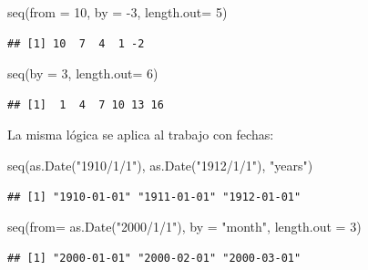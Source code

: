 \documentclass[
]{book}
\newenvironment{Shaded}{\begin{snugshade}}{\end{snugshade}}
\newcommand{\AttributeTok}[1]{\textcolor[rgb]{0.77,0.63,0.00}{#1}}
\newcommand{\DecValTok}[1]{\textcolor[rgb]{0.00,0.00,0.81}{#1}}
\newcommand{\FunctionTok}[1]{\textcolor[rgb]{0.00,0.00,0.00}{#1}}
\newcommand{\NormalTok}[1]{#1}
\newcommand{\SpecialCharTok}[1]{\textcolor[rgb]{0.00,0.00,0.00}{#1}}
\newcommand{\StringTok}[1]{\textcolor[rgb]{0.31,0.60,0.02}{#1}}
\begin{document}
\begin{Shaded}
\begin{Highlighting}[]
\FunctionTok{seq}\NormalTok{(}\AttributeTok{from =} \DecValTok{10}\NormalTok{, }\AttributeTok{by =} \SpecialCharTok{{-}}\DecValTok{3}\NormalTok{, }\AttributeTok{length.out=} \DecValTok{5}\NormalTok{)}
\end{Highlighting}
\end{Shaded}

\begin{verbatim}
## [1] 10  7  4  1 -2
\end{verbatim}

\begin{Shaded}
\begin{Highlighting}[]
\FunctionTok{seq}\NormalTok{(}\AttributeTok{by =} \DecValTok{3}\NormalTok{, }\AttributeTok{length.out=} \DecValTok{6}\NormalTok{)}
\end{Highlighting}
\end{Shaded}

\begin{verbatim}
## [1]  1  4  7 10 13 16
\end{verbatim}

La misma lógica se aplica al trabajo con fechas:

\begin{Shaded}
\begin{Highlighting}[]
\FunctionTok{seq}\NormalTok{(}\FunctionTok{as.Date}\NormalTok{(}\StringTok{"1910/1/1"}\NormalTok{), }\FunctionTok{as.Date}\NormalTok{(}\StringTok{"1912/1/1"}\NormalTok{), }\StringTok{"years"}\NormalTok{)}
\end{Highlighting}
\end{Shaded}

\begin{verbatim}
## [1] "1910-01-01" "1911-01-01" "1912-01-01"
\end{verbatim}

\begin{Shaded}
\begin{Highlighting}[]
\FunctionTok{seq}\NormalTok{(}\AttributeTok{from=} \FunctionTok{as.Date}\NormalTok{(}\StringTok{"2000/1/1"}\NormalTok{), }\AttributeTok{by =} \StringTok{"month"}\NormalTok{, }\AttributeTok{length.out =} \DecValTok{3}\NormalTok{)}
\end{Highlighting}
\end{Shaded}

\begin{verbatim}
## [1] "2000-01-01" "2000-02-01" "2000-03-01"
\end{verbatim}
\end{document}

